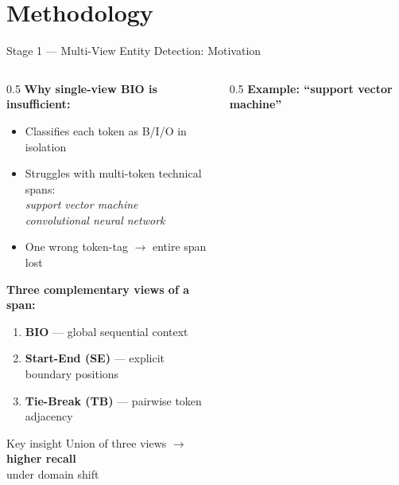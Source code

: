 \documentclass[aspectratio=169,10pt]{beamer}
\newcommand{\hb}[1]{\textcolor{navyblue}{\textbf{#1}}}
\begin{document}
\section{Methodology}

\begin{frame}{Stage 1 — Multi-View Entity Detection: Motivation}
  \begin{columns}[T]
    \begin{column}{0.5\textwidth}
      \textbf{Why single-view BIO is insufficient:}
      \begin{itemize}
        \item Classifies each token as B/I/O in isolation
        \item Struggles with multi-token technical spans:\\
          \emph{support vector machine}\\
          \emph{convolutional neural network}
        \item One wrong token-tag $\to$ entire span lost
      \end{itemize}
      \vspace{0.5em}
      \textbf{Three complementary views of a span:}
      \begin{enumerate}
        \item \hb{BIO} — global sequential context
        \item \hb{Start-End (SE)} — explicit boundary positions
        \item \hb{Tie-Break (TB)} — pairwise token adjacency
      \end{enumerate}
      \vspace{0.5em}
      \begin{block}{Key insight}
        Union of three views $\to$ \textbf{higher recall}\\
        under domain shift
      \end{block}
    \end{column}
    \begin{column}{0.5\textwidth}
      \small
      \textbf{Example: ``support vector machine''}
      \vspace{0.4em}


\end{column}
\end{columns}
\end{frame}
\end{document}

